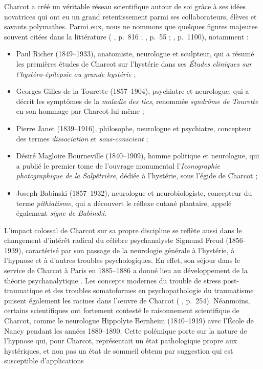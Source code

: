 Charcot a créé un véritable réseau scientifique autour de soi grâce à ses idées novatrices qui ont eu un grand retentissement parmi ses collaborateurs, élèves et savants polymathes. Parmi eux, nous ne nommons que quelques figures majeures souvent citées dans la littérature (\citeauthor{gomes2013jean} \citeyear{gomes2013jean}, p.~816 ; \citeauthor{bogousslavsky2014mysteries} \citeyear{bogousslavsky2014mysteries}, p.~55 ; \citeauthor{camargo2024} \citeyear{camargo2024}, p.~1100), notamment :
\begin{itemize}
\item Paul Richer (1849--1933), anatomiste, neurologue et sculpteur, qui a résumé les premières études de Charcot sur l'hystérie dans ses \textit{Études cliniques sur l'hystéro-épilepsie ou grande hystérie} ;
\item Georges Gilles de la Tourette (1857--1904), psychiatre et neurologue, qui a décrit les symptômes de la \textit{maladie des tics}, renommée \textit{syndrôme de Tourette} en son hommage par Charcot lui-même ;
\item Pierre Janet (1839--1916), philosophe, neurologue et psychiatre, concepteur des termes \textit{dissociation} et \textit{sous-conscient} ;
\item Désiré Magloire Bourneville (1840--1909), homme politique et neurologue, qui a publié le premier tome de l'ouvrage monumental l'\textit{Iconographie photographique de la Salpêtrière}, dédiée à l'hystérie, sous l'égide de Charcot ; 
\item Joseph Babinski (1857--1932), neurologue et neurobiologiste, concepteur du terme \textit{pithiatisme}, qui a découvert le réflexe cutané plantaire, appelé également \textit{signe de Babinski}.
\end{itemize}
\bigskip
L'impact colossal de Charcot sur sa propre discipline se reflète aussi dans le changement d'intérêt radical du célèbre psychanalyste Sigmund Freud (1856--1939), caractérisé par son passage de la neurologie générale à l'hystérie, à l'hypnose et à d'autres troubles psychologiques. En effet, son séjour dans le service de Charcot à Paris en 1885--1886 a donné lieu au développement de la théorie psychanalytique \citep[p.~41]{camargo2018jean}. Les concepts modernes du trouble de stress post-traumatique et des troubles somatoformes en psychopathologie du traumatisme puisent également les racines dans l'\oe{}uvre de Charcot (\citeauthor{white1997jean} \citeyear{white1997jean}, p.~254). Néanmoins, certains scientifiques ont fortement contesté le raisonnement scientifique de Charcot, comme le neurologue Hippolyte Bernheim (1840--1919) avec l'École de Nancy pendant les années 1880--1890. Cette polémique porte sur la nature de l'hypnose qui, pour Charcot, représentait un état pathologique propre aux hystériques, et non pas un état de sommeil obtenu par suggestion qui est susceptible d'applications
